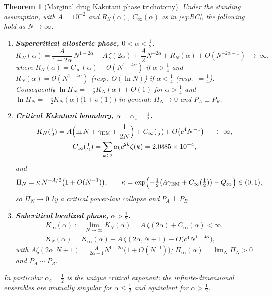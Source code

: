 \documentclass[11pt,reqno]{amsart}
\theoremstyle{plain}
\newtheorem{theorem}{Theorem}[section]
\theoremstyle{definition}
\theoremstyle{remark}
\numberwithin{equation}{section}
\newcommand{\PA}{P_{A}}
\newcommand{\PB}{P_{B}}
\begin{document}
\begin{theorem}[Marginal drug Kakutani phase trichotomy]\label{thm:trichotomy}
Under the standing assumption, with $A=10^{-2}$ and $R_N(\alpha)$, $C_\infty(\alpha)$ as in \eqref{eq:RC}, the following hold as $N\to\infty$.
\begin{enumerate}[label=\textup{(\arabic*)}]
\item \textbf{Supercritical allosteric phase, $0<\alpha<\tfrac12$.}
\begin{equation}\label{eq:super}
K_N(\alpha)=\frac{A}{1-2\alpha}\,N^{1-2\alpha}+A\,\zeta(2\alpha)+\frac A2N^{-2\alpha}+R_N(\alpha)+O(N^{-2\alpha-1})\ \longrightarrow\ \infty,
\end{equation}
where $R_N(\alpha)=C_\infty(\alpha)+O(N^{1-4\alpha})$ if $\alpha>\frac14$ and $R_N(\alpha)=O(N^{1-4\alpha})$ (resp.\ $O(\ln N)$) if $\alpha<\frac14$ (resp.\ $=\frac14$). Consequently $\ln\Pi_N=-\frac12K_N(\alpha)+O(1)$ for $\alpha>\frac14$ and $\ln\Pi_N=-\frac12K_N(\alpha)\bigl(1+o(1)\bigr)$ in general; $\Pi_N\to0$ and $\PA\perp\PB$.
\item \textbf{Critical Kakutani boundary, $\alpha=\alpha_c=\tfrac12$.}
\begin{equation}\label{eq:crit}
\begin{gathered}
K_N(\tfrac12)=A\Bigl(\ln N+\gamma_{\mathrm{EM}}+\frac1{2N}\Bigr)+C_\infty(\tfrac12)+O\bigl(c^4N^{-1}\bigr)\ \longrightarrow\ \infty,\\
C_\infty(\tfrac12)=\sum_{k\ge2}a_kc^{2k}\zeta(k)=2.0885\times10^{-4},
\end{gathered}
\end{equation}
and
\begin{equation}\label{eq:critPi}
\Pi_N=\kappa\,N^{-A/2}\bigl(1+O(N^{-1})\bigr),\qquad \kappa=\exp\Bigl(-\tfrac12\bigl(A\gamma_{\mathrm{EM}}+C_\infty(\tfrac12)\bigr)-Q_\infty\Bigr)\in(0,1),
\end{equation}
so $\Pi_N\to0$ by a critical power-law collapse and $\PA\perp\PB$.
\item \textbf{Subcritical localized phase, $\alpha>\tfrac12$.}
\begin{equation}\label{eq:sub}
\begin{gathered}
K_\infty(\alpha):=\lim_{N\to\infty}K_N(\alpha)=A\,\zeta(2\alpha)+C_\infty(\alpha)<\infty,\\
K_N(\alpha)=K_\infty(\alpha)-A\,\zeta(2\alpha,N+1)-O\bigl(c^4N^{1-4\alpha}\bigr),
\end{gathered}
\end{equation}
with $A\zeta(2\alpha,N+1)=\frac{A}{2\alpha-1}N^{1-2\alpha}\bigl(1+O(N^{-1})\bigr)$; $\Pi_\infty(\alpha)=\lim_N\Pi_N>0$ and $\PA\sim\PB$.
\end{enumerate}
In particular $\alpha_c=\tfrac12$ is the unique critical exponent: the infinite-dimensional ensembles are mutually singular for $\alpha\le\frac12$ and equivalent for $\alpha>\frac12$.
\end{theorem}
\end{document}
